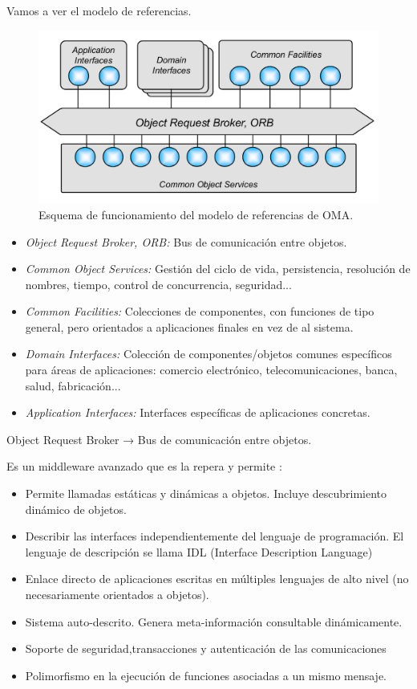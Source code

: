 \documentclass{apuntes}[nochap]
\begin{document}
Vamos a ver el modelo de referencias.


\begin{figure}[hbtp]
\centering
\includegraphics[width=1\textwidth]{img/OMA_Ref.png}
\caption{Esquema de funcionamiento del modelo de referencias de OMA.}
\label{OMA}
\end{figure}

\begin{itemize}
	\item \textit{Object Request Broker, ORB:} Bus de comunicación entre objetos.
	\item \textit{Common Object Services:} Gestión del ciclo de vida, persistencia, resolución de nombres, tiempo, control de concurrencia, seguridad...
	\item \textit{Common Facilities:} Colecciones de componentes, con funciones de tipo general, pero orientados a aplicaciones finales en vez de al sistema.
	\item \textit{Domain Interfaces:} Colección de componentes/objetos comunes específicos para áreas de aplicaciones: comercio electrónico, telecomunicaciones, banca, salud, fabricación...
	\item \textit{Application Interfaces:} Interfaces específicas de aplicaciones concretas.
\end{itemize}

\begin{defn}[ORB]
Object Request Broker → Bus de comunicación entre objetos.

Es un middleware avanzado que es la repera y permite :

\begin{itemize}
	\item Permite llamadas estáticas y dinámicas a objetos. Incluye descubrimiento dinámico de objetos.
	\item Describir las interfaces independientemente del lenguaje de programación. El lenguaje de descripción se llama IDL (Interface Description Language)
	\item Enlace directo de aplicaciones escritas en múltiples lenguajes de alto nivel (no necesariamente orientados a objetos).
	\item Sistema auto-descrito. Genera meta-información consultable dinámicamente.
	\item Soporte de seguridad,transacciones y autenticación de las comunicaciones
	\item Polimorfismo en la ejecución de funciones asociadas a un mismo mensaje.
\end{itemize}
\end{defn}
\end{document}
